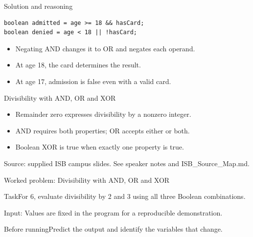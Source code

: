 \documentclass[10pt,aspectratio=169]{beamer}
\begin{document}
\begin{frame}[fragile,t]{Solution and reasoning}
\begin{lstlisting}
boolean admitted = age >= 18 && hasCard;
boolean denied = age < 18 || !hasCard;
\end{lstlisting}\vspace{1mm}\small\begin{itemize}
\item Negating AND changes it to OR and negates each operand.
\item At age 18, the card determines the result.
\item At age 17, admission is false even with a valid card.
\end{itemize}
\end{frame}

\begin{frame}[fragile,t]{Divisibility with AND, OR and XOR}
\begin{itemize}
\item Remainder zero expresses divisibility by a nonzero integer.
\item AND requires both properties; OR accepts either or both.
\item Boolean XOR is true when exactly one property is true.
\end{itemize}
\vspace{3mm}\footnotesize\textcolor{accent}{Source: supplied ISB campus slides. See speaker notes and ISB\_Source\_Map.md.}
\end{frame}

\begin{frame}[fragile,t]{Worked problem: Divisibility with AND, OR and XOR}
\begin{block}{Task}For 6, evaluate divisibility by 2 and 3 using all three Boolean combinations.\end{block}
\small Input: Values are fixed in the program for a reproducible demonstration.\par\vspace{3mm}\begin{exampleblock}{Before running}Predict the output and identify the variables that change.\end{exampleblock}
\end{frame}
\end{document}
